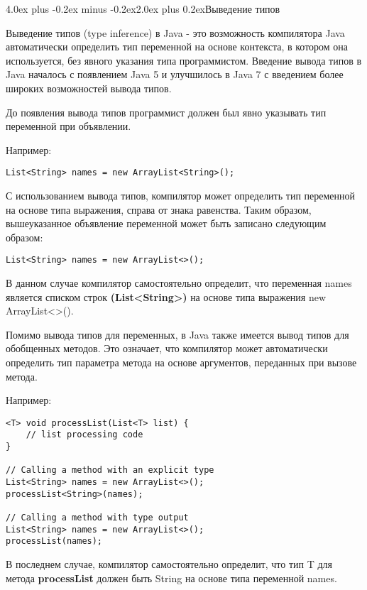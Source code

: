 \documentclass[12pt, a4paper]{book}%
\makeatletter
\renewcommand{\section}{\@startsection{section}{1}{1pt}%
{4.0ex plus -0.2ex minus -0.2ex}{2.0ex plus 0.2ex}{\centering\bf}}%
\makeatother
\begin{document}
{\section{Выведение типов}

Выведение типов (type inference) в Java - это возможность компилятора Java автоматически определить тип переменной на основе контекста, в котором она используется, без явного указания типа программистом. Введение вывода типов в Java началось с появлением Java 5 и улучшилось в Java 7 с введением более широких возможностей вывода типов.

До появления вывода типов программист должен был явно указывать тип переменной при объявлении. 

Например:
\begin{lstlisting}
List<String> names = new ArrayList<String>();
\end{lstlisting}

С использованием вывода типов, компилятор может определить тип переменной на основе типа выражения, справа от знака равенства. Таким образом, вышеуказанное объявление переменной может быть записано следующим образом:

\begin{lstlisting}
List<String> names = new ArrayList<>();
\end{lstlisting}

В данном случае компилятор самостоятельно определит, что переменная names является списком строк {\bf (List<String>)} на основе типа выражения new ArrayList<>().

Помимо вывода типов для переменных, в Java также имеется вывод типов для обобщенных методов. Это означает, что компилятор может автоматически определить тип параметра метода на основе аргументов, переданных при вызове метода. 

Например:

\begin{lstlisting}
<T> void processList(List<T> list) {
    // list processing code
}

// Calling a method with an explicit type
List<String> names = new ArrayList<>();
processList<String>(names);

// Calling a method with type output
List<String> names = new ArrayList<>();
processList(names);

\end{lstlisting}

В последнем случае, компилятор самостоятельно определит, что тип T для метода {\bf processList} должен быть String на основе типа переменной names.

}
\end{document}
